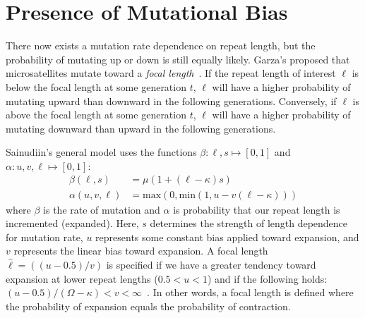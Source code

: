 \section{Presence of Mutational Bias}\label{sec:presenceOfMutationalBias}
There now exists a mutation rate dependence on repeat length, but the probability of mutating up or down is still
equally likely.
Garza's proposed that microsatellites mutate toward a \emph{focal
length}~\cite{garzaMicrosatelliteAlleleFrequencies1995}.
If the repeat length of interest $\ell$ is below the focal length at some generation $t$, $\ell$ will have a higher
probability of mutating upward than downward in the following generations.
Conversely, if $\ell$ is above the focal length at some generation $t$, $\ell$ will have a higher probability of
mutating downward than upward in the following generations.

Sainudiin's general model uses the functions $\beta : \ell, s \mapsto [0, 1]$ and $\alpha : u, v, \ell \mapsto [0, 1]$:
\begin{align}
    \beta(\ell, s) &= \mu (1 + (\ell - \kappa)s) \\
    \alpha(u, v, \ell) &= \text{max} (0, \text{min}(1, u - v(\ell - \kappa)))
\end{align}
where $\beta$ is the rate of mutation and $\alpha$ is probability that our repeat length is incremented (expanded).
Here, $s$ determines the strength of length dependence for mutation rate, $u$ represents some constant bias applied
toward expansion, and $v$ represents the linear bias toward expansion.
A focal length $\hat{\ell} = ((u - 0.5) / v)$ is specified if we have a greater tendency toward
expansion at lower repeat lengths ($0.5 < u < 1$) and if the following holds:
$(u - 0.5) / (\Omega - \kappa) < v < \infty$~\cite{sainudiinMicrosatelliteMutationModels2004}.
In other words, a focal length is defined where the probability of expansion equals the probability of contraction.

